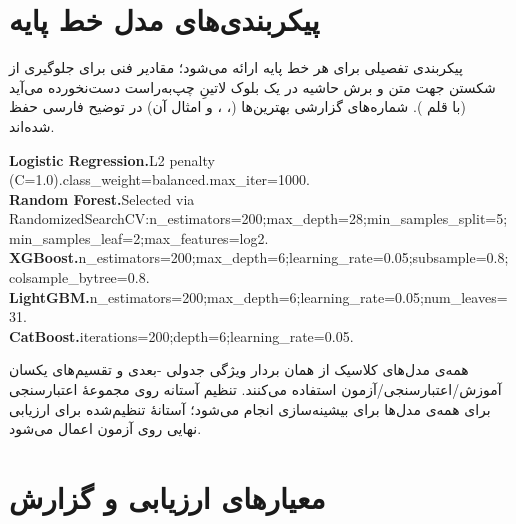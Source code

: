 \section{پیکربندی‌های مدل خط پایه}

پیکربندی تفصیلی برای هر خط پایه ارائه می‌شود؛ مقادیر فنی برای جلوگیری از شکستن جهت متن و برش حاشیه در یک بلوک لاتینِ چپ‌به‌راست دست‌نخورده می‌آید (با قلم ). شماره‌های گزارشی بهترین‌ها (، ، و امثال آن) در توضیح فارسی حفظ شده‌اند.
\begin{latin}\footnotesize\setlength{\parskip}{0.35em}\setlength{\parindent}{0pt}\ttfamily\sloppy\raggedright
\textbf{Logistic Regression.}\quad L2 penalty (C{=}1.0).\quad class\_weight{=}balanced.\quad max\_iter{=}1000.\\[-0.1em]
\textbf{Random Forest.}\quad Selected via RandomizedSearchCV:\quad n\_estimators{=}200;\quad max\_depth{=}28;\quad min\_samples\_split{=}5;\quad min\_samples\_leaf{=}2;\quad max\_features{=}log2.\\[-0.1em]
\textbf{XGBoost.}\quad n\_estimators{=}200;\quad max\_depth{=}6;\quad learning\_rate{=}0{.}05;\quad subsample{=}0{.}8;\quad colsample\_bytree{=}0{.}8.\\[-0.1em]
\textbf{LightGBM.}\quad n\_estimators{=}200;\quad max\_depth{=}6;\quad learning\_rate{=}0{.}05;\quad num\_leaves{=}31.\\[-0.1em]
\textbf{CatBoost.}\quad iterations{=}200;\quad depth{=}6;\quad learning\_rate{=}0{.}05.
\end{latin}
همه‌ی مدل‌های کلاسیک از همان بردار ویژگی جدولی -بعدی و تقسیم‌های یکسان آموزش/اعتبارسنجی/آزمون استفاده می‌کنند. تنظیم آستانه روی مجموعۀ اعتبارسنجی برای همه‌ی مدل‌ها برای بیشینه‌سازی  انجام می‌شود؛ آستانۀ تنظیم‌شده برای ارزیابی نهایی روی آزمون اعمال می‌شود.

\section{معیارهای ارزیابی و گزارش}

